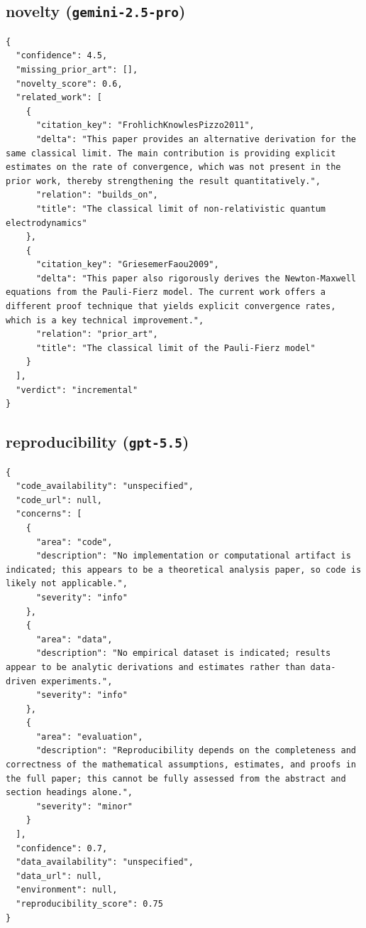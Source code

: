 \documentclass[11pt]{article}
\begin{document}
\subsection*{novelty (\texttt{gemini-2.5-pro})}
\begin{verbatim}
{
  "confidence": 4.5,
  "missing_prior_art": [],
  "novelty_score": 0.6,
  "related_work": [
    {
      "citation_key": "FrohlichKnowlesPizzo2011",
      "delta": "This paper provides an alternative derivation for the same classical limit. The main contribution is providing explicit estimates on the rate of convergence, which was not present in the prior work, thereby strengthening the result quantitatively.",
      "relation": "builds_on",
      "title": "The classical limit of non-relativistic quantum electrodynamics"
    },
    {
      "citation_key": "GriesemerFaou2009",
      "delta": "This paper also rigorously derives the Newton-Maxwell equations from the Pauli-Fierz model. The current work offers a different proof technique that yields explicit convergence rates, which is a key technical improvement.",
      "relation": "prior_art",
      "title": "The classical limit of the Pauli-Fierz model"
    }
  ],
  "verdict": "incremental"
}
\end{verbatim}

\subsection*{reproducibility (\texttt{gpt-5.5})}
\begin{verbatim}
{
  "code_availability": "unspecified",
  "code_url": null,
  "concerns": [
    {
      "area": "code",
      "description": "No implementation or computational artifact is indicated; this appears to be a theoretical analysis paper, so code is likely not applicable.",
      "severity": "info"
    },
    {
      "area": "data",
      "description": "No empirical dataset is indicated; results appear to be analytic derivations and estimates rather than data-driven experiments.",
      "severity": "info"
    },
    {
      "area": "evaluation",
      "description": "Reproducibility depends on the completeness and correctness of the mathematical assumptions, estimates, and proofs in the full paper; this cannot be fully assessed from the abstract and section headings alone.",
      "severity": "minor"
    }
  ],
  "confidence": 0.7,
  "data_availability": "unspecified",
  "data_url": null,
  "environment": null,
  "reproducibility_score": 0.75
}
\end{verbatim}
\end{document}

